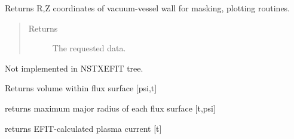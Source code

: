 \documentclass[letterpaper,10pt,english]{sphinxmanual}
\begin{document}
\begin{fulllineitems}
\begin{fulllineitems}
\end{fulllineitems}


\begin{fulllineitems}
\label{eqtools:eqtools.NSTXEFIT.NSTXEFITTree.getMachineCrossSection}
Returns R,Z coordinates of vacuum-vessel wall for masking, plotting routines.
\begin{quote}\begin{description}
\item[{Returns}] \leavevmode
The requested data.

\end{description}\end{quote}

\end{fulllineitems}


\begin{fulllineitems}
\label{eqtools:eqtools.NSTXEFIT.NSTXEFITTree.getFluxVol}
Not implemented in NSTXEFIT tree.

Returns volume within flux surface {[}psi,t{]}

\end{fulllineitems}


\begin{fulllineitems}
\label{eqtools:eqtools.NSTXEFIT.NSTXEFITTree.getRmidPsi}
returns maximum major radius of each flux surface {[}t,psi{]}

\end{fulllineitems}


\begin{fulllineitems}
\label{eqtools:eqtools.NSTXEFIT.NSTXEFITTree.getIpCalc}
returns EFIT-calculated plasma current {[}t{]}

\end{fulllineitems}



\end{fulllineitems}
\end{document}
